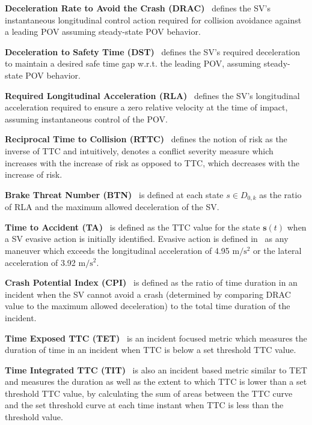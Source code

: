 \documentclass[journal]{IEEEtran}
\newcommand{\s}{\mathbf{s}}
\begin{document}
\textbf{Deceleration Rate to Avoid the Crash (DRAC)}~\cite{cooper1976traffic} defines the SV's instantaneous longitudinal control action required for collision avoidance against a leading POV assuming steady-state POV behavior.

\textbf{Deceleration to Safety Time (DST)}~\cite{hupfer1997deceleration} defines the SV's required deceleration to maintain a desired safe time gap w.r.t. the leading POV, assuming steady-state POV behavior.

\textbf{Required Longitudinal Acceleration (RLA)}~\cite{Jansson2005CollisionAT} defines the SV's longitudinal acceleration required to ensure a zero relative velocity at the time of impact, assuming instantaneous control of the POV.

\textbf{Reciprocal Time to Collision (RTTC)}~\cite{chin1992quantitative} defines the notion of risk as the inverse of TTC and intuitively, denotes a conflict severity measure which increases with the increase of risk as opposed to TTC, which decreases with the increase of risk. 

\textbf{Brake Threat Number (BTN)}~\cite{Jansson2005CollisionAT} is defined at each state $s \in {D}_{0,k}$ as the ratio of RLA and the maximum allowed deceleration of the SV.

\textbf{Time to Accident (TA)}~\cite{perkins1967traffic} is defined as the TTC value for the state $\s(t)$ when a SV evasive action is initially identified. Evasive action is defined in~\cite{dingus2006100} as any maneuver which exceeds the longitudinal acceleration of 4.95 $\mathrm{m/s^2}$ or the lateral acceleration of 3.92 $\mathrm{m/s^2}$.  

\textbf{Crash Potential Index (CPI)}~\cite{cunto2008assessing} is defined as the ratio of time duration in an incident when the SV cannot avoid a crash (determined by comparing DRAC value to the maximum allowed deceleration) to the total time duration of the incident.

\textbf{Time Exposed TTC (TET)}~\cite{minderhoud2001extended} is an incident focused metric which measures the duration of time in an incident when TTC is below a set threshold TTC value.

\textbf{Time Integrated TTC (TIT)}~\cite{minderhoud2001extended} is also an incident based metric similar to TET and measures the duration as well as the extent to which TTC is lower than a set threshold TTC value, by calculating the sum of areas between the TTC curve and the set threshold curve at each time instant when TTC is less than the threshold value.   
\end{document}
